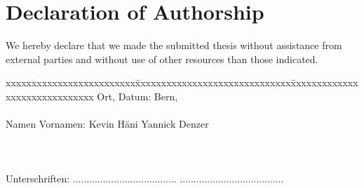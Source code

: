 \chapter*{Declaration of Authorship}
\label{chap:selbstaendigkeitserklaerung}

\vspace*{10mm} 

We hereby declare that we made the submitted thesis without assistance from external parties and without use of other resources than those indicated.

\vspace{15mm}

\begin{tabbing}
xxxxxxxxxxxxxxxxxxxxxxxxx\=xxxxxxxxxxxxxxxxxxxxxxxxxxxxxx\=xxxxxxxxxxxxxxxxxxxxxxxxxxxxxx\kill
Ort, Datum:		\> Bern, \versiondate \\ \\ 
Namen Vornamen:	\> Kevin Häni 	\> Yannick Denzer \\ \\ \\ \\ 
Unterschriften:	\> ......................................\> ...................................... \\
\end{tabbing}
